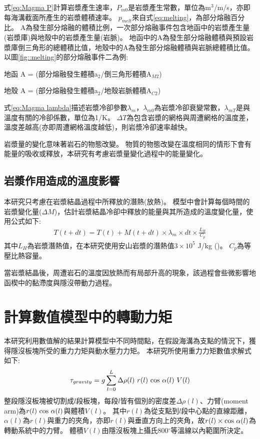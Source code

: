式\ref{eq:Magma P}計算岩漿產生速率，$P_{m0}$是岩漿產生常數，單位為m$^3$/m/s，亦即每海溝截面所產生的岩漿體積速率。
$p_{melt}$來自式\ref{eq:melting}，為部分熔融百分比。
A為發生部分熔融的體積比例，一次部分熔融事件包含地函中的岩漿產生量(岩漿庫)與地殼中的岩漿產生量(岩脈)。
地函中的A為發生部分熔融體積與預設岩漿庫倒三角形的總體積比值，地殼中的A為發生部分熔融體積與岩脈總體積比值。
以圖\ref{fig::melting}的部分熔融事件二為例:

地函 A = (部分熔融發生體積a$_2$/倒三角形體積A$_{M2}$)

地殼 A = (部分熔融發生體積a$_2$/地殼岩脈體積A$_{C2}$)


式\ref{eq:Magma lambda}描述岩漿冷卻參數$\lambda_m$，$\lambda_{m0}$為岩漿冷卻衰變常數，$\lambda_{mT}$是與溫度有關的冷卻係數，單位為1/K。
$\Delta T$為包含岩漿的網格與周遭網格的溫度差，溫度差越高(亦即周遭網格溫度越低)，則岩漿冷卻速率越快。

岩漿量的變化意味著岩石的物態改變。
物質的物態改變在溫度相同的情形下會有能量的吸收或釋放，本研究有考慮岩漿量變化過程中的能量變化。
\subsection{岩漿作用造成的溫度影響}\label{岩漿作用造成的溫度影響}
本研究只考慮在岩漿結晶過程中所釋放的潛熱(放熱)。
模型中會計算每個時間的岩漿變化量($\Delta M$)，估計岩漿結晶冷卻中釋放的能量與其所造成的溫度變化量，使用公式如下:
\begin{align}
    T(t+dt) = T(t) + M(t+dt)\times \lambda_m \times dt \times \frac{L_H}{C_p}\label{eq:latent heat}
\end{align}
其中$L_H$為岩漿潛熱值，在本研究使用安山岩漿的潛熱值$3\times 10^5$ J/kg (\citealp{liu2011modeling})。
$C_p$為等壓比熱容量。

當岩漿結晶後，周遭岩石的溫度因放熱而有局部升高的現象，該過程會些微影響地函楔中的黏滯度與隱沒帶動力過程。

\section{計算數值模型中的轉動力矩}\label{計算數值模型中的轉動力矩}
本研究利用數值解的結果計算模型中不同時間點，在假設海溝為支點的情況下，獲得隱沒板塊所受的重力力矩與動水壓力力矩。
本研究所使用重力力矩數值求解式如下:
\begin{align}
    \tau_{gravity} =  g\sum ^L_{l=0} \Delta \rho(l)\ r(l)\ {\rm cos}\ \alpha (l)\ V(l) 
    \label{eqn:tau_gravity}
\end{align}
整段隱沒板塊被切割成$l$段板塊，每段$l$皆有個別的密度差$\Delta \rho(l)$、力臂(moment arm)為$r(l)\ {\rm cos}\ \alpha (l)$與體積$V(l)$。
其中$r(l)$為從支點到$l$段中心點的直線距離，$\alpha (l)$為$r(l)$與重力的夾角，亦即$r(l)$與垂直方向上的夾角，故$r(l)\times {\rm cos}\ \alpha (l)$為轉動系統中的力臂。
體積$V(l)$由隱沒板塊上攝氏800$^{\circ}$等溫線以內範圍所決定。

